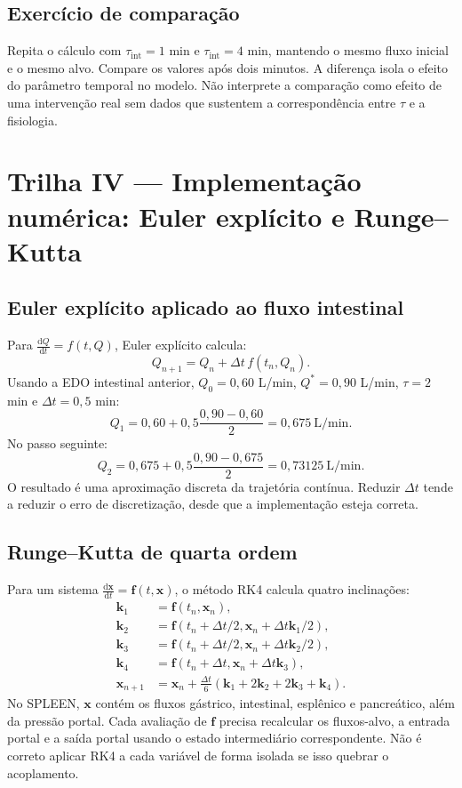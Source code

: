 \documentclass[11pt,a4paper,oneside]{book}
\newcommand{\diff}[2]{\frac{\mathrm{d}#1}{\mathrm{d}#2}}
\begin{document}
\section{Exercício de comparação}
Repita o cálculo com $\tau_{\mathrm{int}}=1$ min e $\tau_{\mathrm{int}}=4$ min, mantendo o mesmo fluxo inicial e o mesmo alvo. Compare os valores após dois minutos. A diferença isola o efeito do parâmetro temporal no modelo. Não interprete a comparação como efeito de uma intervenção real sem dados que sustentem a correspondência entre $\tau$ e a fisiologia.

\chapter{Trilha IV — Implementação numérica: Euler explícito e Runge--Kutta}

\section{Euler explícito aplicado ao fluxo intestinal}
Para $\diff{Q}{t}=f(t,Q)$, Euler explícito calcula:
\begin{equation}
Q_{n+1}=Q_n+\Delta t\,f(t_n,Q_n).
\end{equation}
Usando a EDO intestinal anterior, $Q_0=0{,}60$ L/min, $Q^*=0{,}90$ L/min, $\tau=2$ min e $\Delta t=0{,}5$ min:
\[
Q_1=0{,}60+0{,}5\frac{0{,}90-0{,}60}{2}
=0{,}675\ \mathrm{L/min}.
\]
No passo seguinte:
\[
Q_2=0{,}675+0{,}5\frac{0{,}90-0{,}675}{2}
=0{,}73125\ \mathrm{L/min}.
\]
O resultado é uma aproximação discreta da trajetória contínua. Reduzir $\Delta t$ tende a reduzir o erro de discretização, desde que a implementação esteja correta.

\section{Runge--Kutta de quarta ordem}
Para um sistema $\diff{\bm{x}}{t}=\bm{f}(t,\bm{x})$, o método RK4 calcula quatro inclinações:
\begin{align*}
\bm{k}_1&=\bm{f}(t_n,\bm{x}_n),\\
\bm{k}_2&=\bm{f}(t_n+\Delta t/2,\bm{x}_n+\Delta t\bm{k}_1/2),\\
\bm{k}_3&=\bm{f}(t_n+\Delta t/2,\bm{x}_n+\Delta t\bm{k}_2/2),\\
\bm{k}_4&=\bm{f}(t_n+\Delta t,\bm{x}_n+\Delta t\bm{k}_3),\\
\bm{x}_{n+1}&=\bm{x}_n+\frac{\Delta t}{6}
(\bm{k}_1+2\bm{k}_2+2\bm{k}_3+\bm{k}_4).
\end{align*}
No SPLEEN, $\bm{x}$ contém os fluxos gástrico, intestinal, esplênico e pancreático, além da pressão portal. Cada avaliação de $\bm f$ precisa recalcular os fluxos-alvo, a entrada portal e a saída portal usando o estado intermediário correspondente. Não é correto aplicar RK4 a cada variável de forma isolada se isso quebrar o acoplamento.
\end{document}
